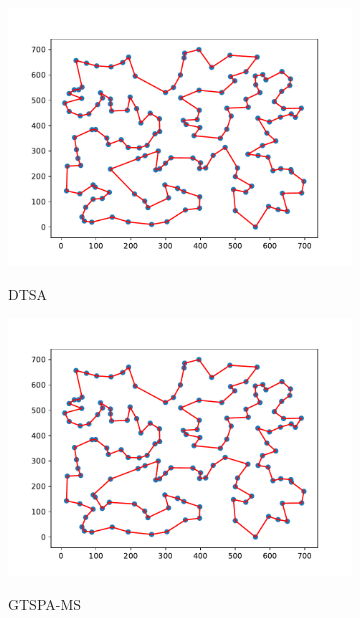 \documentclass[12pt]{article}
\theoremstyle{plain}
\theoremstyle{definition}
\theoremstyle{remark}
\begin{document}
\begin{figure}[ht]
	\centering
	\begin{subfigure}{.5\textwidth}
		\centering
		\includegraphics[scale = 0.44]{../../Implementation/gen/best_path_dtsa_ch150}
		\label{fig:best_path_dtsa_ch150}
		\caption{DTSA}
	\end{subfigure}%
	\begin{subfigure}{.5\textwidth}
		\centering
		\includegraphics[scale = 0.44]{../../Implementation/gen/best_path_gtspams_ch150}
		\label{fig:best_path_gtspams_ch150}
		\caption{GTSPA-MS}
	\end{subfigure}
	\begin{subfigure}{.5\textwidth}
		\centering

\end{subfigure}
\end{figure}
\end{document}
